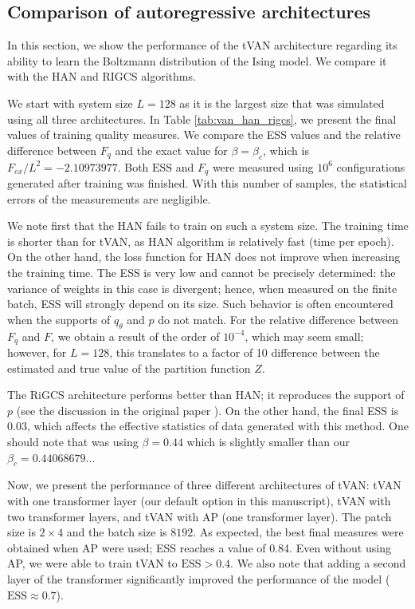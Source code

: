 \documentclass[3p, times,merge]{elsarticle}
\begin{document}
\subsection{Comparison of autoregressive architectures}
\label{comparison_with_other_arch}


In this section, we show the performance of the tVAN architecture regarding its ability to learn the Boltzmann distribution of the Ising model. We compare it with the HAN \cite{Bialas:2022qbs} and RIGCS \cite{Singha:2025lsd} algorithms. 

We start with system size $L=128$ as it is the largest size that was simulated using all three architectures. In Table \ref{tab:van_han_rigcs}, we present the final values of training quality measures. We compare the ESS values and the relative difference between $F_q$ and the exact value for $\beta=\beta_c$, which is $F_{ex}/L^2=-2.10973977$. 
Both $\text{ESS}$ and $F_q$ were measured using $10^6$ configurations generated after training was finished. With this number of samples, the statistical errors of the measurements are negligible.

We note first that the HAN fails to train on such a system size. The training time is shorter than for tVAN, as HAN algorithm is relatively fast (time per epoch). On the other hand, the loss function for HAN does not improve when increasing the training time. The ESS is very low and cannot be precisely determined: the variance of weights in this case is divergent; hence, when measured on the finite batch, ESS will strongly depend on its size. Such behavior is often encountered when the supports of $q_\theta$ and $p$ do not match. For the relative difference between $F_q$ and $F$, we obtain a result of the order of $10^{-4}$, which may seem small; however, for $L=128$, this translates to a factor of 10 difference between the estimated and true value of the partition function $Z$. 

The RiGCS architecture performs better than HAN; it reproduces the support of $p$ (see the discussion in the original paper \cite{Singha:2025lsd}). On the other hand, the final ESS is 0.03, which affects the effective statistics of data generated with this method. One should note that \cite{Singha:2025lsd} was using $\beta=0.44$ which is slightly smaller than our $\beta_c=0.44068679\ldots$

Now, we present the performance of three different architectures of tVAN: tVAN with one transformer layer (our default option in this manuscript), tVAN with two transformer layers, and tVAN with AP (one transformer layer). The patch size is $2\times4$ and the batch size is $8192$. As expected, the best final measures were obtained when AP were used; ESS reaches a value of 0.84. Even without using AP, we were able to train tVAN to $\text{ESS}>0.4$. We also note that adding a second layer of the transformer significantly improved the performance of the model ($\text{ESS}\approx0.7$).
\end{document}

